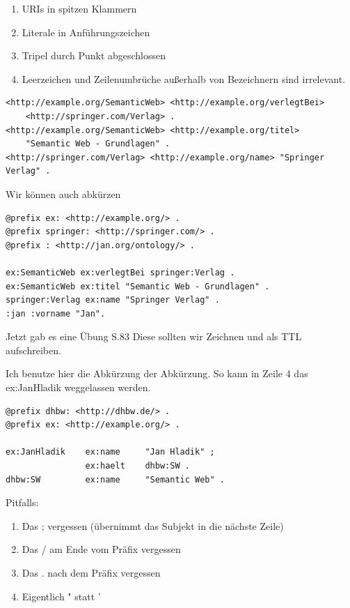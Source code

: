 \documentclass[a4paper]{article}
\begin{document}
\begin{enumerate}
    \item URIs in spitzen Klammern
    \item Literale in Anführungszeichen
    \item Tripel durch Punkt abgeschlossen
    \item Leerzeichen und Zeilenumbrüche außerhalb von Bezeichnern sind irrelevant.
\end{enumerate}

\begin{lstlisting}
<http://example.org/SemanticWeb> <http://example.org/verlegtBei>
    <http://springer.com/Verlag> .
<http://example.org/SemanticWeb> <http://example.org/titel>
    "Semantic Web - Grundlagen" .
<http://springer.com/Verlag> <http://example.org/name> "Springer Verlag" .
\end{lstlisting}

Wir können auch abkürzen

\begin{lstlisting}
@prefix ex: <http://example.org/> .
@prefix springer: <http://springer.com/> .
@prefix : <http://jan.org/ontology/> .

ex:SemanticWeb ex:verlegtBei springer:Verlag .
ex:SemanticWeb ex:titel "Semantic Web - Grundlagen" .
springer:Verlag ex:name "Springer Verlag" .
:jan :vorname "Jan".
\end{lstlisting}

Jetzt gab es eine Übung S.83 Diese sollten wir Zeichnen und als TTL aufschreiben.

Ich benutze hier die Abkürzung der Abkürzung. So kann in Zeile 4 das ex:JanHladik weggelassen werden.

\begin{lstlisting}
@prefix dhbw: <http://dhbw.de/> .
@prefix ex: <http://example.org/> .

ex:JanHladik    ex:name     "Jan Hladik" ;
                ex:haelt    dhbw:SW .
dhbw:SW         ex:name     "Semantic Web" . 
\end{lstlisting}

Pitfalls:

\begin{enumerate}
    \item Das ; vergessen (übernimmt das Subjekt in die nächste Zeile)
    \item Das / am Ende vom Präfix vergessen
    \item Das . nach dem Präfix vergessen
    \item Eigentlich " statt ' %
\end{enumerate}
\end{document}
